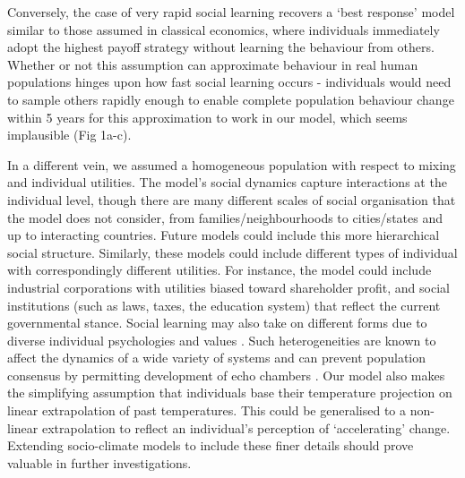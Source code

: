 \documentclass[10pt,letterpaper]{article}
\begin{document}
Conversely, the case of very rapid social learning recovers a `best response' model similar to those assumed in classical economics, where individuals immediately adopt the highest payoff strategy without learning the behaviour from others.  Whether or not this assumption can approximate behaviour in real human populations hinges upon how fast social learning occurs - individuals would need to sample others rapidly enough to enable complete population behaviour change within 5 years for this approximation to work in our model, which seems implausible (Fig 1a-c).




In a different vein, we assumed a homogeneous population with respect to mixing and individual utilities. The model's social dynamics capture interactions at the individual level, though there are many different scales of social organisation that the model does not consider, from families/neighbourhoods to cities/states and up to interacting countries. Future models could include this more hierarchical social structure. Similarly, these models could include different types of individual with correspondingly different utilities. For instance, the model could include industrial corporations with utilities biased toward shareholder profit, and social institutions (such as laws, taxes, the education system) that reflect the current governmental stance. Social learning may also take on different forms due to diverse individual psychologies and values \cite{blackmore07,collins09,ison15}. Such heterogeneities are known to affect the dynamics of a wide variety of systems \cite{durrett94} and can prevent population consensus by permitting development of echo chambers \cite{delvicario16}. Our model also makes the simplifying assumption that individuals base their temperature projection on linear extrapolation of past temperatures. This could be generalised to a non-linear extrapolation to reflect an individual's perception of `accelerating' change. Extending socio-climate models to include these finer details should prove valuable in further investigations.
\end{document}
